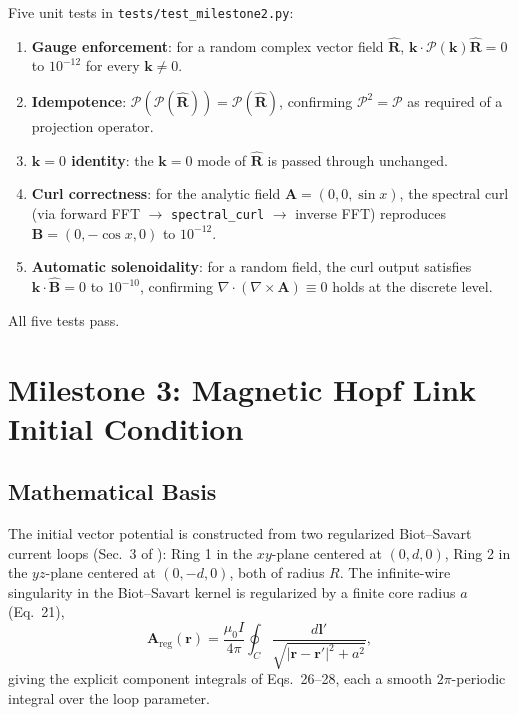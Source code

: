 \documentclass[11pt, a4paper]{article}
\newcommand{\curl}{\nabla \times}
\renewcommand{\div}{\nabla \cdot}
\begin{document}
Five unit tests in \texttt{tests/test\_milestone2.py}:
\begin{enumerate}
    \item \textbf{Gauge enforcement}: for a random complex vector field
    $\hat{\mathbf{R}}$, $\mathbf{k}\cdot\mathcal{P}(\mathbf{k})\hat{\mathbf{R}}
    = 0$ to $10^{-12}$ for every $\mathbf{k}\ne 0$.
    \item \textbf{Idempotence}: $\mathcal{P}(\mathcal{P}(\hat{\mathbf{R}}))
    = \mathcal{P}(\hat{\mathbf{R}})$, confirming $\mathcal{P}^2=\mathcal{P}$
    as required of a projection operator.
    \item \textbf{$\mathbf{k}=0$ identity}: the $\mathbf{k}=0$ mode of
    $\hat{\mathbf{R}}$ is passed through unchanged.
    \item \textbf{Curl correctness}: for the analytic field
    $\mathbf{A}=(0,0,\sin x)$, the spectral curl (via forward FFT $\to$
    \texttt{spectral\_curl} $\to$ inverse FFT) reproduces
    $\mathbf{B}=(0,-\cos x,0)$ to $10^{-12}$.
    \item \textbf{Automatic solenoidality}: for a random field, the curl
    output satisfies $\mathbf{k}\cdot\hat{\mathbf{B}}=0$ to $10^{-10}$,
    confirming $\div(\curl\mathbf{A})\equiv 0$ holds at the discrete level.
\end{enumerate}
All five tests pass.

\section{Milestone 3: Magnetic Hopf Link Initial Condition}
\label{sec:milestone3}

\subsection{Mathematical Basis}

The initial vector potential is constructed from two regularized
Biot--Savart current loops (Sec.~3 of \citealp{foundation2026}): Ring 1 in
the $xy$-plane centered at $(0,d,0)$, Ring 2 in the $yz$-plane centered at
$(0,-d,0)$, both of radius $R$. The infinite-wire singularity in the
Biot--Savart kernel is regularized by a finite core radius $a$
(Eq.~21),
\begin{equation}
    \mathbf{A}_{\mathrm{reg}}(\mathbf{r}) = \frac{\mu_0 I}{4\pi}
    \oint_C \frac{d\mathbf{l}'}{\sqrt{|\mathbf{r}-\mathbf{r}'|^2 + a^2}},
\end{equation}
giving the explicit component integrals of Eqs.~26--28, each a smooth
$2\pi$-periodic integral over the loop parameter.
\end{document}
